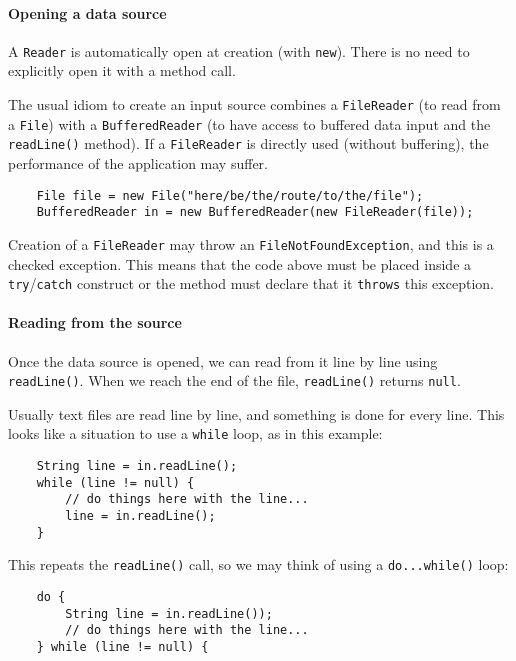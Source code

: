 \paragraph{Opening a data source}
\label{sec:open-data-source}

A \verb+Reader+ is automatically open at creation (with
\verb+new+). There is no need to explicitly open it with a method
call. 

The usual idiom to create an input source
combines a \verb+FileReader+ (to read from a
\verb+File+) with a \verb+BufferedReader+ (to have access to buffered
data input and the \verb+readLine()+ method). If a \verb+FileReader+ is
directly used (without buffering), the performance of the application
may suffer. 

\begin{verbatim}
    File file = new File("here/be/the/route/to/the/file");
    BufferedReader in = new BufferedReader(new FileReader(file)); 
\end{verbatim}

Creation of a \verb+FileReader+ may throw an
\verb+FileNotFoundException+, and this is a checked exception. This
means that the code above must be placed inside a \verb+try+/\verb+catch+
construct or the method must declare that it \verb+throws+ this
exception. 

\paragraph{Reading from the source}
\label{sec:reading-from-source}

Once the data source is opened, we can read from it line by line using
\verb+readLine()+. When we reach the end of the file,
\verb+readLine()+ returns \verb+null+. 

Usually text files are read line by line, and something is done 
for every line. This looks like a situation to use a \verb+while+
loop, as in this example:

\begin{verbatim}
    String line = in.readLine();
    while (line != null) {
        // do things here with the line...
        line = in.readLine();
    }
\end{verbatim}

This repeats the \verb+readLine()+ call, so we may think of using a
\verb+do...while()+ loop: 

\begin{verbatim}
    do {
        String line = in.readLine());
        // do things here with the line...
    } while (line != null) {
\end{verbatim}

